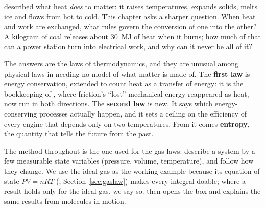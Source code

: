 
 described what heat \emph{does} to matter: it raises temperatures, expands solids,
melts ice and flows from hot to cold. This chapter asks a sharper question. When heat and work are
exchanged, what rules govern the conversion of one into the other? A kilogram of coal releases about
\SI{30}{MJ} of heat when it burns; how much of that can a power station turn into electrical work, and
why can it never be all of it?

The answers are the laws of thermodynamics, and they are unusual among physical laws in needing no
model of what matter is made of. The \textbf{first law} is energy conservation, extended to count heat as
a transfer of energy: it is the bookkeeping of , where friction's ``lost'' mechanical
energy reappeared as heat, now run in both directions. The \textbf{second law} is new. It says which
energy-conserving processes actually happen, and it sets a ceiling on the efficiency of every engine that
depends only on two temperatures. From it comes \textbf{entropy}, the quantity that tells the future from
the past.

The method throughout is the one used for the gas laws: describe a system by a few measurable state
variables (pressure, volume, temperature), and follow how they change. We use the ideal gas as the
working example because its equation of state $PV=nRT$ (, Section~\ref{sec:gaslaw}) makes every integral
doable; where a result holds only for the ideal gas, we say so.  then opens the box
and explains the same results from molecules in motion.

